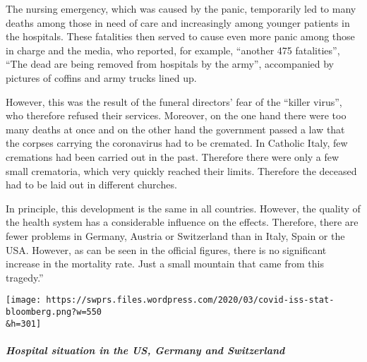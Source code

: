 The nursing emergency, which was caused by the panic, temporarily led to
many deaths among those in need of care and increasingly among younger
patients in the hospitals. These fatalities then served to cause even
more panic among those in charge and the media, who reported, for
example, ``another 475 fatalities'', ``The dead are being removed from
hospitals by the army'', accompanied by pictures of coffins and army
trucks lined up.

However, this was the result of the funeral directors' fear of the
``killer virus'', who therefore refused their services. Moreover, on the
one hand there were too many deaths at once and on the other hand the
government passed a law that the corpses carrying the coronavirus had to
be cremated. In Catholic Italy, few cremations had been carried out in
the past. Therefore there were only a few small crematoria, which very
quickly reached their limits. Therefore the deceased had to be laid out
in different churches.

In principle, this development is the same in all countries. However,
the quality of the health system has a considerable influence on the
effects. Therefore, there are fewer problems in Germany, Austria or
Switzerland than in Italy, Spain or the USA. However, as can be seen in
the official figures, there is no significant increase in the mortality
rate. Just a small mountain that came from this tragedy.''

\texttt{[image: https://swprs.files.wordpress.com/2020/03/covid-iss-stat-bloomberg.png?w=550\\\&h=301]}

\hypertarget{hospital-situation-in-the-us-germany-and-switzerland}{%
\subparagraph{\texorpdfstring{\textbf{Hospital situation in the US,
Germany and
Switzerland}}{Hospital situation in the US, Germany and Switzerland}}\label{hospital-situation-in-the-us-germany-and-switzerland}}

